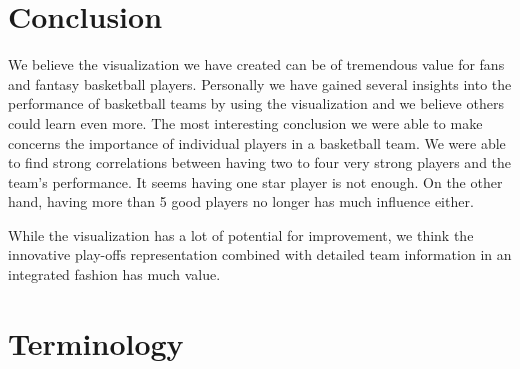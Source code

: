 \documentclass[chi_draft]{sigchi}
\begin{document}
\section{Conclusion}\label{sec:conclusion}
We believe the visualization we have created can be of tremendous value for fans
and fantasy basketball players. Personally we have gained several insights into
the performance of basketball teams by using the visualization and we believe
others could learn even more. 
The most interesting conclusion we were able to make concerns the importance of
individual players in a basketball team. We were able to find strong
correlations between having two to four very strong players and the team's
performance. It seems having one star player is not enough. On the other hand,
having more than 5 good players no longer has much influence either. 

While the visualization has a lot of potential for improvement, we think the
innovative play-offs representation combined with detailed team information in
an integrated fashion has much value.

%
%
%
%
%
\balance{}

%

\printbibliography
{}

\appendix
\section{Terminology}\label{sec:terminology}
\end{document}
